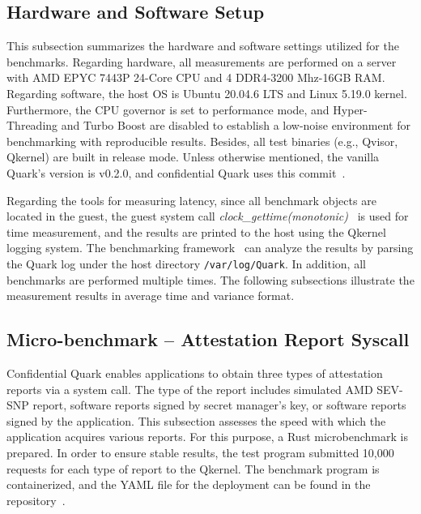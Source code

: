 
\subsection{Hardware and Software Setup}\label{Hardware_and_Software_Setup}

This subsection summarizes the hardware and software settings utilized for the benchmarks. Regarding hardware, all measurements are performed on a server with AMD EPYC 7443P 24-Core CPU and 4 DDR4-3200 Mhz-16GB RAM. Regarding software, the host OS is Ubuntu 20.04.6 LTS and Linux 5.19.0 kernel. 
Furthermore, the CPU governor is set to performance mode, and Hyper-Threading and Turbo Boost are disabled to establish a low-noise environment for benchmarking with reproducible results. Besides, all test binaries (e.g., Qvisor, Qkernel) are built in 
release mode. Unless otherwise mentioned, the vanilla Quark's version is v0.2.0, and confidential Quark uses this commit~\cite*{qualitativ_confidentail_quark}.


Regarding the tools for measuring latency, since all benchmark objects are located in the guest, the guest system call \emph{clock\_gettime(monotonic)}~\cite*{clock_gettime} is used for time measurement, and the results are printed to the host using the Qkernel logging system. The 
benchmarking framework~\cite*{benchamark_framework} can analyze the results by parsing the Quark log under the host directory \texttt{/var/log/Quark}. In addition, all benchmarks are performed multiple times. The following subsections illustrate the measurement results in average time and variance format.

\subsection{Micro-benchmark – Attestation Report Syscall}\label{Attestation_Report_Syscall}

Confidential Quark enables applications to obtain three types of attestation reports via a system call. The type of the report includes simulated AMD SEV-SNP report, software reports signed by secret manager's key, or software reports signed by the application. This subsection assesses the speed with which the 
application acquires various reports. For this purpose, a Rust microbenchmark\cite*{benchamark_Attestation_Report_Syscall} is prepared. In order to ensure stable results, the test program submitted 10,000 requests for each type of report to the Qkernel. The benchmark program is containerized, 
and the YAML file for the deployment can be found in the repository~\cite*{perf_test_repo}.

